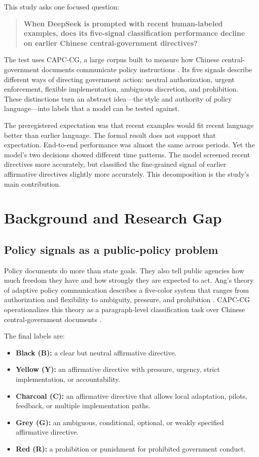\documentclass[11pt]{article}
\begin{document}
This study asks one focused question:

\begin{quote}
\textbf{When DeepSeek is prompted with recent human-labeled examples, does its five-signal classification performance decline on earlier Chinese central-government directives?}
\end{quote}

The test uses CAPC-CG, a large corpus built to measure how Chinese central-government documents communicate policy instructions \cite{sun2026}. Its five signals describe different ways of directing government action: neutral authorization, urgent enforcement, flexible implementation, ambiguous discretion, and prohibition. These distinctions turn an abstract idea---the style and authority of policy language---into labels that a model can be tested against.

The preregistered expectation was that recent examples would fit recent language better than earlier language. The formal result does not support that expectation. End-to-end performance was almost the same across periods. Yet the model's two decisions showed different time patterns. The model screened recent directives more accurately, but classified the fine-grained signal of earlier affirmative directives slightly more accurately. This decomposition is the study's main contribution.

\section{Background and Research Gap}

\subsection{Policy signals as a public-policy problem}

Policy documents do more than state goals. They also tell public agencies how much freedom they have and how strongly they are expected to act. Ang's theory of adaptive policy communication describes a five-color system that ranges from authorization and flexibility to ambiguity, pressure, and prohibition \cite{ang2024}. CAPC-CG operationalizes this theory as a paragraph-level classification task over Chinese central-government documents \cite{sun2026}.

The final labels are:

\begin{itemize}
    \item \textbf{Black (B):} a clear but neutral affirmative directive.
    \item \textbf{Yellow (Y):} an affirmative directive with pressure, urgency, strict implementation, or accountability.
    \item \textbf{Charcoal (C):} an affirmative directive that allows local adaptation, pilots, feedback, or multiple implementation paths.
    \item \textbf{Grey (G):} an ambiguous, conditional, optional, or weakly specified affirmative directive.
    \item \textbf{Red (R):} a prohibition or punishment for prohibited government conduct.
\end{itemize}
\end{document}
